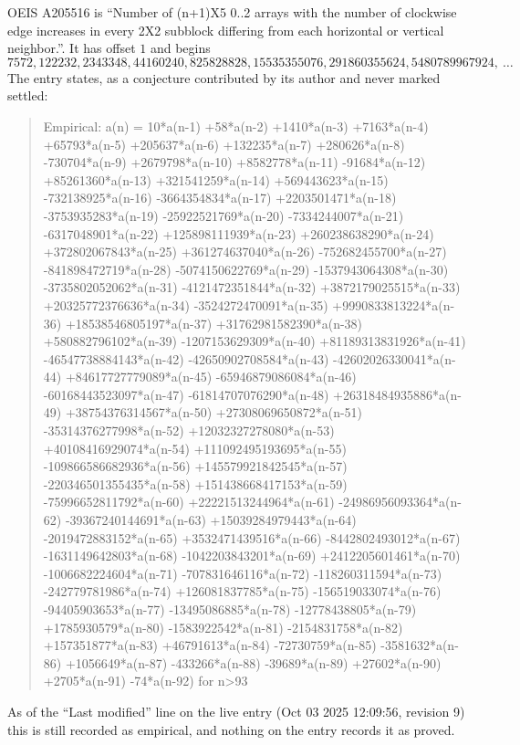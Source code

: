 \documentclass[11pt,a4paper]{article}
\theoremstyle{plain}
\theoremstyle{definition}
\begin{document}
OEIS A205516 is ``Number of (n+1)X5 0..2 arrays with the number of clockwise edge increases in every 2X2 subblock differing from each horizontal or vertical neighbor.''. It has offset $1$ and begins
\[
7572, 122232, 2343348, 44160240, 825828828, 15535355076, 291860355624, 5480789967924,\ \dots
\]
The entry states, as a conjecture contributed by its author and never marked settled:
\begin{quote}
Empirical: a(n) = 10*a(n-1) +58*a(n-2) +1410*a(n-3) +7163*a(n-4) +65793*a(n-5) +205637*a(n-6) +132235*a(n-7) +280626*a(n-8) -730704*a(n-9) +2679798*a(n-10) +8582778*a(n-11) -91684*a(n-12) +85261360*a(n-13) +321541259*a(n-14) +569443623*a(n-15) -732138925*a(n-16) -3664354834*a(n-17) +2203501471*a(n-18) -3753935283*a(n-19) -25922521769*a(n-20) -7334244007*a(n-21) -6317048901*a(n-22) +125898111939*a(n-23) +260238638290*a(n-24) +372802067843*a(n-25) +361274637040*a(n-26) -752682455700*a(n-27) -841898472719*a(n-28) -5074150622769*a(n-29) -1537943064308*a(n-30) -3735802052062*a(n-31) -4121472351844*a(n-32) +3872179025515*a(n-33) +20325772376636*a(n-34) -3524272470091*a(n-35) +9990833813224*a(n-36) +18538546805197*a(n-37) +31762981582390*a(n-38) +580882796102*a(n-39) -1207153629309*a(n-40) +81189313831926*a(n-41) -46547738884143*a(n-42) -42650902708584*a(n-43) -42602026330041*a(n-44) +84617727779089*a(n-45) -65946879086084*a(n-46) -60168443523097*a(n-47) -61814707076290*a(n-48) +26318484935886*a(n-49) +38754376314567*a(n-50) +27308069650872*a(n-51) -35314376277998*a(n-52) +12032327278080*a(n-53) +40108416929074*a(n-54) +111092495193695*a(n-55) -109866586682936*a(n-56) +145579921842545*a(n-57) -220346501355435*a(n-58) +151438668417153*a(n-59) -75996652811792*a(n-60) +22221513244964*a(n-61) -24986956093364*a(n-62) -39367240144691*a(n-63) +15039284979443*a(n-64) -2019472883152*a(n-65) +3532471439516*a(n-66) -8442802493012*a(n-67) -1631149642803*a(n-68) -1042203843201*a(n-69) +2412205601461*a(n-70) -1006682224604*a(n-71) -707831646116*a(n-72) -118260311594*a(n-73) -242779781986*a(n-74) +126081837785*a(n-75) -156519033074*a(n-76) -94405903653*a(n-77) -13495086885*a(n-78) -12778438805*a(n-79) +1785930579*a(n-80) -1583922542*a(n-81) -2154831758*a(n-82) +157351877*a(n-83) +46791613*a(n-84) -72730759*a(n-85) -3581632*a(n-86) +1056649*a(n-87) -433266*a(n-88) -39689*a(n-89) +27602*a(n-90) +2705*a(n-91) -74*a(n-92) for n>93
\end{quote}
As of the ``Last modified'' line on the live entry (Oct 03 2025 12:09:56, revision 9) this is still
recorded as empirical, and nothing on the entry records it as proved.
\end{document}
